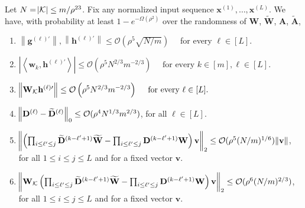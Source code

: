 \begin{lemma}
	Let $N=\abs{\mathcal{K}} \leq m / \rho^{23}$. Fix any normalized input sequence $\mathbf{x}^{(1)}, \ldots, \mathbf{x}^{(L)}$. We
	have, with probability at least $1-e^{-\Omega\left(\rho^{2}\right)}$ over the randomness of $\mathbf{W}$, $\widetilde{\mathbf{W}}$, $\mathbf{A}$, $\widetilde{\mathbf{A}}$,
	\begin{enumerate}
		\item $\left\|\mathbf{g}^{(\ell)\prime}\right\|,\left\|\mathbf{h}^{(\ell)\prime}\right\| \leq \mathcal{O}\left(\rho^{5} \sqrt{N / m}\right) \quad$ for every $\ell \in[L].$
		\item $\left|\left\langle \mathbf{w}_{k}, \mathbf{h}^{(\ell)\prime}\right\rangle\right| \leq \mathcal{O}\left(\rho^{5} N^{2 / 3} m^{-2 / 3}\right) \quad \text { for every } k \in [m], \ell \in[L].$
		\item $\norm{ \mathbf{W}_{\mathcal{K}} \mathbf{h}^{(\ell)\prime}}\leq \mathcal{O}\left(\rho^{5} N^{2 / 3} m^{-2 / 3}\right) \quad \text { for every }  \ell \in[L].$
		\item $\norm{\mathbf{D}^{(\ell)} - \widetilde{\mathbf{D}}^{(\ell)}}_0 \le \mathcal{O}(\rho^4 N^{1/3} m^{2/3})$, for all $\ell \in [L]$.
		\item $\norm{ \left(\prod_{i \le \ell' \le j} \widetilde{\mathbf{D}}^{(k - \ell' + 1)} \widetilde{\mathbf{W}}  - \prod_{i \le \ell' \le j} \mathbf{D}^{(k - \ell' + 1)} \mathbf{W} \right) \mathbf{v}}_{2} \le  \mathcal{O}(\rho^5 (N/m)^{1/6}) \norm{\mathbf{v}}$, for all $1 \le i \le j \le L$ and for a fixed vector $\mathbf{v}$.
		\item $\norm{\mathbf{W}_{\mathcal{K}} \left(\prod_{i \le \ell' \le j} \widetilde{\mathbf{D}}^{(k - \ell' + 1)} \widetilde{\mathbf{W}}  - \prod_{i \le \ell' \le j} \mathbf{D}^{(k - \ell' + 1)} \mathbf{W}\right) \mathbf{v}}_2 \le  \mathcal{O}(\rho^6 (N/m)^{2/3})$, for all $1 \le i \le j \le L$  and for a fixed vector $\mathbf{v}$.
	\end{enumerate}
\end{lemma}


